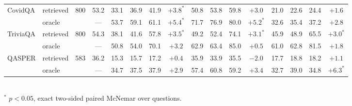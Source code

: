 \begin{table}[t]
\begin{tabular}{llcc cccc cccc cccc}
\midrule
\multirow{2}{*}{CovidQA} & retrieved & \multirow{2}{*}{800} & 53.2 & 33.1 & 36.9 & 41.9 & $+3.8^{*}$ & 50.8 & 53.8 & 59.8 & $+3.0$ & 21.0 & 22.6 & 24.4 & $+1.6$ \\
 & oracle &  & --- & 53.7 & 59.1 & 61.1 & $+5.4^{*}$ & 71.7 & 76.9 & 80.0 & $+5.2^{*}$ & 32.6 & 35.4 & 37.2 & $+2.8$ \\
\midrule
\multirow{2}{*}{TriviaQA} & retrieved & \multirow{2}{*}{800} & 54.3 & 38.1 & 41.6 & 57.8 & $+3.5^{*}$ & 49.2 & 52.4 & 74.1 & $+3.1^{*}$ & 45.9 & 48.9 & 65.5 & $+3.0^{*}$ \\
 & oracle &  & --- & 50.8 & 54.0 & 70.1 & $+3.2$ & 62.9 & 63.4 & 85.0 & $+0.5$ & 61.0 & 62.8 & 81.5 & $+1.8$ \\
\midrule
\multirow{2}{*}{QASPER} & retrieved & \multirow{2}{*}{583} & 36.2 & 15.3 & 15.7 & 17.2 & $+0.4$ & 35.9 & 33.9 & 35.5 & $-2.0$ & 17.7 & 18.8 & 18.2 & $+1.1$ \\
 & oracle &  & --- & 34.7 & 37.5 & 37.9 & $+2.9$ & 57.4 & 60.8 & 59.2 & $+3.4$ & 32.7 & 39.0 & 34.8 & $+6.3^{*}$ \\
\bottomrule
\end{tabular}\\[2pt]
\footnotesize{$^{*}$ $p<0.05$, exact two-sided paired McNemar over questions.}
\end{table}
